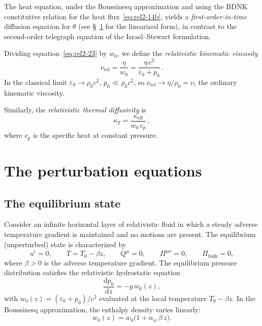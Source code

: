 The heat equation, under the Boussinesq approximation and using the
BDNK constitutive relation for the heat flux~\eqref{eq:rel2-14b}, yields
a \emph{first-order-in-time} diffusion equation for $\theta$ (see
\S~\ref{sec:rel9} for the linearized form), in contrast to the
second-order telegraph equation of the Israel--Stewart formulation.

Dividing equation~\eqref{eq:rel2-23} by $w_0$, we define the
\emph{relativistic kinematic viscosity}
\begin{equation}
\label{eq:rel2-24}
  \nu_{\mathrm{rel}} = \frac{\eta}{w_0}
  = \frac{\eta\,c^2}{\varepsilon_0 + p_0}\,.
\end{equation}
In the classical limit $\varepsilon_0 \to \rho_0 c^2$, $p_0 \ll \rho_0 c^2$,
so $\nu_{\mathrm{rel}} \to \eta/\rho_0 = \nu$, the ordinary
kinematic viscosity.

Similarly, the \emph{relativistic thermal diffusivity} is
\begin{equation}
\label{eq:rel2-25}
  \kappa_T = \frac{\kappa_{\mathrm{eff}}}{w_0\,c_p}\,,
\end{equation}
where $c_p$ is the specific heat at constant pressure.

\section{The perturbation equations}\label{sec:rel9}

\subsection{The equilibrium state}\label{sec:rel9a}

Consider an infinite horizontal layer of relativistic fluid in which a
steady adverse temperature gradient is maintained and no motions are present.
The equilibrium (unperturbed) state is characterized by
\begin{equation}
\label{eq:rel2-26}
  u^i = 0, \qquad T = T_0 - \beta z, \qquad Q^\mu = 0,
  \qquad \Pi^{\mu\nu} = 0, \qquad \Pi_{\mathrm{bulk}} = 0,
\end{equation}
where $\beta > 0$ is the adverse temperature gradient.  The equilibrium
pressure distribution satisfies the relativistic hydrostatic equation
\begin{equation}
\label{eq:rel2-27}
  \frac{\mathrm{d}p_0}{\mathrm{d}z} = -g\,w_0(z),
\end{equation}
with $w_0(z) = (\varepsilon_0 + p_0)/c^2$ evaluated at the local
temperature $T_0 - \beta z$.  In the Boussinesq approximation, the
enthalpy density varies linearly:
\begin{equation}
\label{eq:rel2-28}
  w_0(z) = w_0\bigl(1 + \alpha_w\,\beta\,z\bigr).
\end{equation}

